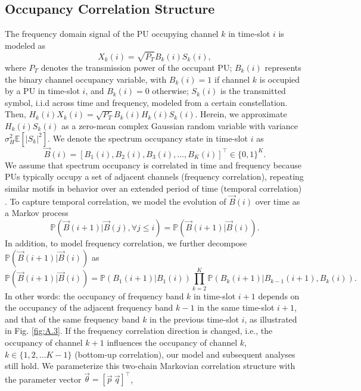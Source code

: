 \documentclass[12pt, draftcls, onecolumn]{IEEEtran}
\begin{document}
\subsection{Occupancy Correlation Structure}\label{I.II}
The frequency domain signal of the PU occupying channel $k$ in time-slot $i$ is modeled as
\begin{equation}\label{3}
    X_{k}(i)=\sqrt{P_{T}}B_{k}(i)S_{k}(i),
\end{equation}
where $P_{T}$ denotes the transmission power of the occupant PU; $B_{k}(i)$ represents the binary channel occupancy variable, with $B_{k}(i){=}1$ if channel $k$ is occupied by a PU in time-slot $i$, and $B_{k}(i){=}0$ otherwise; $S_{k}(i)$ is the transmitted symbol, i.i.d across time and frequency, modeled from a certain constellation. Then, $H_{k}(i)X_{k}(i){=}\sqrt{P_{T}}B_{k}(i)H_{k}(i)S_{k}(i)$. Herein, we approximate $H_{k}(i)S_{k}(i)$ as a zero-mean complex Gaussian random variable with variance $\sigma_{H}^{2}\mathbb{E}[|S_{k}|^{2}]$. We denote the spectrum occupancy state in time-slot $i$ as
\begin{equation}\label{4}
    \vec{B}(i)=[B_{1}(i),B_{2}(i),B_{3}(i),\dots,B_{K}(i)]^{\intercal}{\in}\{0,1\}^{K}.
\end{equation}
We assume that spectrum occupancy is correlated in time and frequency because PUs typically occupy a set of adjacent channels (frequency correlation), repeating similar motifs in behavior over an extended period of time (temporal correlation) \cite{WCL:12, 4213046,McHenry:2006:CSO:1234388.1234389}. To capture temporal correlation, we model the evolution of $\vec{B}(i)$ over time as a Markov process
\begin{equation}\label{5}
    \mathbb{P}(\vec{B}(i+1)|\vec{B}(j),\forall j \leq i)=\mathbb{P}(\vec{B}(i+1)|\vec{B}(i)).
\end{equation}
In addition, to model frequency correlation, we further decompose $\mathbb{P}(\vec{B}(i+1)|\vec{B}(i))$ as
\begin{equation}\label{6}
    \mathbb{P}(\vec{B}(i+1)|\vec{B}(i))=\mathbb{P}(B_{1}(i+1)|B_{1}(i))\prod_{k=2}^{K}\mathbb{P}(B_{k}(i+1)|B_{k-1}(i+1),B_{k}(i)).
\end{equation}
In other words: the occupancy of frequency band $k$ in time-slot $i+1$ depends on the occupancy of the adjacent frequency band $k-1$ in the same time-slot $i+1$, and that of the same frequency band $k$ in the previous time-slot $i$,
as illustrated in Fig. \ref{fig:A.3}. If the frequency correlation direction is changed, i.e., the occupancy of channel $k+1$ influences the occupancy of channel $k$, $k{\in}\{1,2,...K{-}1\}$ (bottom-up correlation), our model and subsequent analyses still hold. We parameterize this two-chain Markovian correlation structure with the parameter vector $\vec{\theta}=[\vec{p}\ \vec{q}]^{\intercal}$, 
\end{document}
